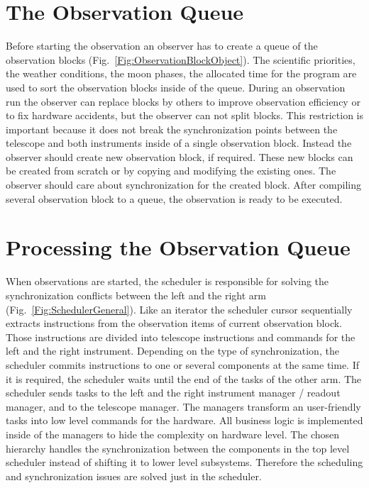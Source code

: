 \section{The Observation Queue}


Before starting the observation an observer has to create a queue of the observation blocks (Fig.~\ref{Fig:ObservationBlockObject}).
The scientific priorities, the weather conditions, the moon phases, the allocated time for the program are used to sort the observation blocks inside of the queue.
During an observation run the observer can replace blocks by others to improve observation efficiency or to fix hardware accidents,
but the observer can not split blocks. 
This restriction is important because it does not break the synchronization points between the telescope and both instruments inside of a single observation block.
Instead the observer should create new observation block, if required. These new blocks can be created from scratch or by copying and modifying the existing ones. 
The observer should care about synchronization for the created block.
After compiling several observation block to a queue, the observation is ready to be executed.

\section{Processing the Observation Queue}

When observations are started, the scheduler is responsible for solving the synchronization conflicts between the left and the right arm (Fig.~\ref{Fig:SchedulerGeneral}).
Like an iterator the scheduler cursor sequentially extracts instructions from the observation items of current observation block.
Those instructions are divided into telescope instructions and commands for the left and the right instrument. 
Depending on the type of synchronization, the scheduler commits instructions to one or several components at the same time. 
If it is required, the scheduler waits until the end of the tasks of the other arm. 
The scheduler sends tasks to the left and the right instrument manager / readout manager, and to the telescope manager. 
The managers transform an user-friendly tasks into low level commands for the hardware.
All business logic is implemented inside of the managers to hide the complexity on hardware level. The chosen hierarchy handles the synchronization between 
the components in the top level scheduler instead of shifting it to lower level subsystems.  
Therefore the scheduling and synchronization issues are solved just in the scheduler. 

